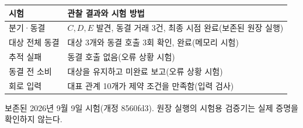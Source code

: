 \begin{center}
\begin{minipage}{\columnwidth}
\centering\small\captionsetup{hypcap=false}
\label{tab:eval-functional}
\begin{tabularx}{\columnwidth}{@{}>{\raggedright\arraybackslash}p{24mm}Y@{}}
\toprule
시험 & 관찰 결과와 시험 방법 \\ \midrule
분기·동결 & $C,D,E$ 발견, 동결 거래 3건, 최종 시점 완료(보존된 원장 실행) \\
대상 전체 동결 & 대상 3개와 동결 호출 3회 확인, 완료(메모리 시험) \\
추적 실패 & 동결 호출 없음(오류 상황 시험) \\
동결 전 소비 & 대상을 유지하고 미완료 보고(오류 상황 시험) \\
회로 입력 & 대표 관계 10개가 제약 조건을 만족함(입력 검사) \\
\bottomrule
\end{tabularx}
\par\smallskip\footnotesize 보존된 2026년 9월 9일 시험(개정 8560fd3). 원장 실행의 시험용 검증기는 실제 증명을 확인하지 않는다.
\end{minipage}
\end{center}
